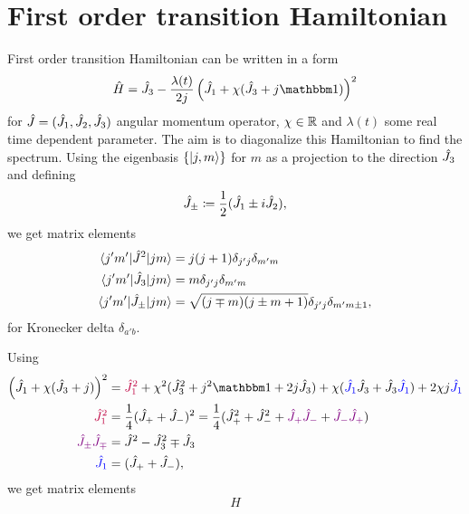 \chapter{First order transition Hamiltonian}
First order transition Hamiltonian can be written in a form
\begin{equation}
    \HH=\J_3-\frac{\lambda(t)}{2j}\left(\J_1+\chi(\J_3+j\Id)\right)^2
    \label{eq:firstOrderTransitionHamiltonian}
\end{equation}
for $\hat{J}=(\hat{J}_1,\hat{J}_2,\hat{J}_3)$ angular momentum operator, $\chi\in\mathbb{R}$ and $\lambda(t)$ some real time dependent parameter. The aim is to diagonalize this Hamiltonian to find the spectrum. Using the eigenbasis $\{\ket{j,m}\}$ for $m$ as a projection to the direction $\hat{J}_3$ and defining
\begin{equation}
    \hat{J}_\pm\coloneqq\frac{1}{2}(\hat{J}_1\pm i\hat{J}_2),
\end{equation}
we get matrix elements
\begin{align}
    \braket{j'm'|\hat{J}^2|jm} &= j(j+1)\delta_{j'j}\delta_{m'm}\\
    \braket{j'm'|\hat{J}_3|jm} &= m \delta_{j'j}\delta_{m'm}\\
    \braket{j'm'|\hat{J}_\pm|jm} &= \sqrt{(j\mp m)(j\pm m+1)}\delta_{j'j}\delta_{m'm\pm 1},
\end{align}
for Kronecker delta $\delta_{a'b}$.

Using
\begin{align}
        \left(\J_1+\chi(\J_3+j)\right)^2 &= \textcolor{purple}{\J_1^2} +\chi^2 (\J_3^2+j^2\Id+2j\J_3)+\chi(\textcolor{blue}{\J_1}\J_3+\J_3\textcolor{blue}{\J_1})+2\chi j\textcolor{blue}{\J_1}\\
        \textcolor{purple}{\J_1^2}&= \frac{1}{4}(\J_++\J_-)^2= \frac{1}{4}(\J_+^2+\J_-^2+\textcolor{violet}{\J_+\J_-}+\textcolor{violet}{\J_-\J_+})\\ 
        \textcolor{violet}{\J_\pm\J_\mp}&=\J^2-\J_3^2 \mp \J_3\\
        \textcolor{blue}{\J_1}&=(\J_+ +\J_-),
\end{align}
we get matrix elements
\begin{equation}
    H
\end{equation}